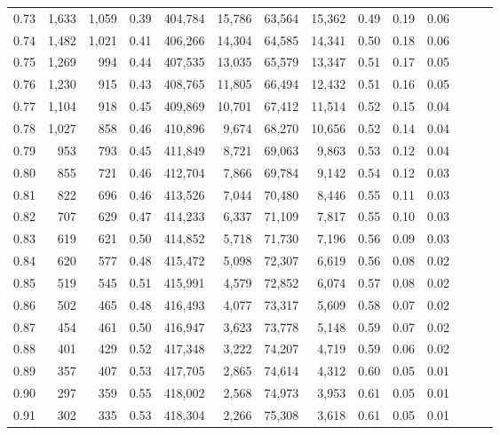 \begin{tabular}{rrrrrrrrrrrrrr}
0.73 &  1,633 &  1,059 &  0.39 &  404,784 &   15,786 &  63,564 &  15,362 &  0.49 &  0.19 &      0.06 \\
0.74 &  1,482 &  1,021 &  0.41 &  406,266 &   14,304 &  64,585 &  14,341 &  0.50 &  0.18 &      0.06 \\
0.75 &  1,269 &    994 &  0.44 &  407,535 &   13,035 &  65,579 &  13,347 &  0.51 &  0.17 &      0.05 \\
0.76 &  1,230 &    915 &  0.43 &  408,765 &   11,805 &  66,494 &  12,432 &  0.51 &  0.16 &      0.05 \\
0.77 &  1,104 &    918 &  0.45 &  409,869 &   10,701 &  67,412 &  11,514 &  0.52 &  0.15 &      0.04 \\
0.78 &  1,027 &    858 &  0.46 &  410,896 &    9,674 &  68,270 &  10,656 &  0.52 &  0.14 &      0.04 \\
0.79 &    953 &    793 &  0.45 &  411,849 &    8,721 &  69,063 &   9,863 &  0.53 &  0.12 &      0.04 \\
0.80 &    855 &    721 &  0.46 &  412,704 &    7,866 &  69,784 &   9,142 &  0.54 &  0.12 &      0.03 \\
0.81 &    822 &    696 &  0.46 &  413,526 &    7,044 &  70,480 &   8,446 &  0.55 &  0.11 &      0.03 \\
0.82 &    707 &    629 &  0.47 &  414,233 &    6,337 &  71,109 &   7,817 &  0.55 &  0.10 &      0.03 \\
0.83 &    619 &    621 &  0.50 &  414,852 &    5,718 &  71,730 &   7,196 &  0.56 &  0.09 &      0.03 \\
0.84 &    620 &    577 &  0.48 &  415,472 &    5,098 &  72,307 &   6,619 &  0.56 &  0.08 &      0.02 \\
0.85 &    519 &    545 &  0.51 &  415,991 &    4,579 &  72,852 &   6,074 &  0.57 &  0.08 &      0.02 \\
0.86 &    502 &    465 &  0.48 &  416,493 &    4,077 &  73,317 &   5,609 &  0.58 &  0.07 &      0.02 \\
0.87 &    454 &    461 &  0.50 &  416,947 &    3,623 &  73,778 &   5,148 &  0.59 &  0.07 &      0.02 \\
0.88 &    401 &    429 &  0.52 &  417,348 &    3,222 &  74,207 &   4,719 &  0.59 &  0.06 &      0.02 \\
0.89 &    357 &    407 &  0.53 &  417,705 &    2,865 &  74,614 &   4,312 &  0.60 &  0.05 &      0.01 \\
0.90 &    297 &    359 &  0.55 &  418,002 &    2,568 &  74,973 &   3,953 &  0.61 &  0.05 &      0.01 \\
0.91 &    302 &    335 &  0.53 &  418,304 &    2,266 &  75,308 &   3,618 &  0.61 &  0.05 &      0.01 \\

\end{tabular}
